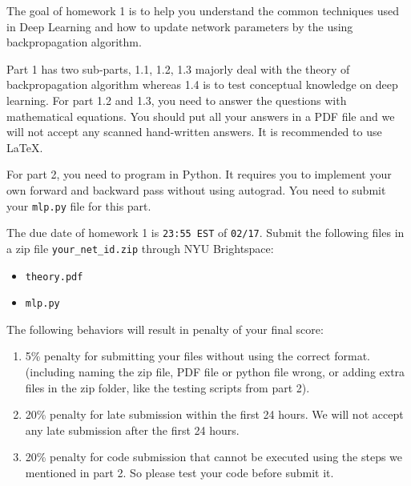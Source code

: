 The goal of homework 1 is to help you understand the common techniques used in Deep Learning and how to update network parameters by the using backpropagation algorithm.

Part 1 has two sub-parts, 1.1, 1.2, 1.3 majorly deal with the theory of backpropagation algorithm whereas 1.4 is to test conceptual knowledge on deep learning. For part 1.2 and 1.3, you need to answer the questions with mathematical equations. You should put all your answers in a PDF file and we will not accept any scanned hand-written answers. It is recommended to use \LaTeX.

For part 2, you need to program in Python. It requires you to implement your own forward and backward pass without using autograd. You need to submit your \texttt{mlp.py} file for this part.

The due date of homework 1 is \texttt{23:55 EST} of \texttt{02/17}.
Submit the following files in a zip file \texttt{your\_net\_id.zip} through NYU Brightspace:
\begin{itemize}
\item \texttt{theory.pdf}
\item \texttt{mlp.py}
\end{itemize}

The following behaviors will result in penalty of your final score:
\begin{enumerate}
\item 5\% penalty for submitting your files without using the correct format. (including naming the zip file, PDF file or python file wrong, or adding extra files in the zip folder, like the testing scripts from part 2). 
\item 20\% penalty for late submission within the first 24 hours. We will not accept any late submission after the first 24 hours.
\item 20\% penalty for code submission that cannot be executed using the steps we mentioned in part 2.
So please test your code before submit it.
\end{enumerate}





